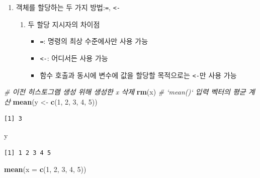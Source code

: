 \documentclass[11pt,a4paper]{book}
\newenvironment{Shaded}{\begin{snugshade}}{\end{snugshade}}
\newcommand{\KeywordTok}[1]{\textcolor[rgb]{0.13,0.29,0.53}{\textbf{#1}}}
\newcommand{\DataTypeTok}[1]{\textcolor[rgb]{0.13,0.29,0.53}{#1}}
\newcommand{\DecValTok}[1]{\textcolor[rgb]{0.00,0.00,0.81}{#1}}
\newcommand{\StringTok}[1]{\textcolor[rgb]{0.31,0.60,0.02}{#1}}
\newcommand{\CommentTok}[1]{\textcolor[rgb]{0.56,0.35,0.01}{\textit{#1}}}
\newcommand{\NormalTok}[1]{#1}
\providecommand{\tightlist}{%
  \setlength{\itemsep}{0pt}\setlength{\parskip}{0pt}}
\theoremstyle{definition}
\theoremstyle{definition}
\theoremstyle{definition}
\theoremstyle{remark}
\begin{document}
\begin{enumerate}
\def\labelenumi{\arabic{enumi}.}
\tightlist
\item
  객체를 할당하는 두 가지 방법:\texttt{=}, \texttt{\textless{}-}

  \begin{enumerate}
  \def\labelenumii{\arabic{enumii})}
  \tightlist
  \item
    두 할당 지시자의 차이점

    \begin{itemize}
    \tightlist
    \item
      \texttt{=}: 명령의 최상 수준에사만 사용 가능
    \item
      \texttt{\textless{}-}: 어디서든 사용 가능
    \item
      함수 호출과 동시에 변수에 값을 할당할 목적으로는
      \texttt{\textless{}-}만 사용 가능
    \end{itemize}
  \end{enumerate}
\end{enumerate}

\footnotesize

\begin{Shaded}
\begin{Highlighting}[]
\CommentTok{# 이전 히스토그램 생성 위해 생성한 x 삭제}
\KeywordTok{rm}\NormalTok{(x)}
\CommentTok{# `mean()` 입력 벡터의 평균 계산}
\KeywordTok{mean}\NormalTok{(y <-}\StringTok{ }\KeywordTok{c}\NormalTok{(}\DecValTok{1}\NormalTok{, }\DecValTok{2}\NormalTok{, }\DecValTok{3}\NormalTok{, }\DecValTok{4}\NormalTok{, }\DecValTok{5}\NormalTok{))}
\end{Highlighting}
\end{Shaded}

\begin{verbatim}
[1] 3
\end{verbatim}

\begin{Shaded}
\begin{Highlighting}[]
\NormalTok{y}
\end{Highlighting}
\end{Shaded}

\begin{verbatim}
[1] 1 2 3 4 5
\end{verbatim}

\begin{Shaded}
\begin{Highlighting}[]
\KeywordTok{mean}\NormalTok{(}\DataTypeTok{x =} \KeywordTok{c}\NormalTok{(}\DecValTok{1}\NormalTok{, }\DecValTok{2}\NormalTok{, }\DecValTok{3}\NormalTok{, }\DecValTok{4}\NormalTok{, }\DecValTok{5}\NormalTok{))}
\end{Highlighting}
\end{Shaded}
\end{document}
